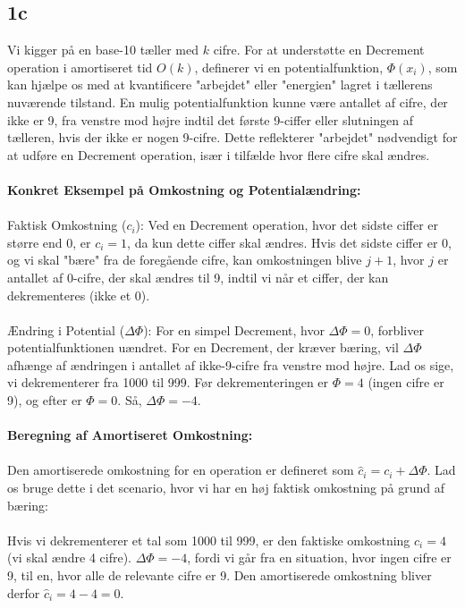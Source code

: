 \documentclass{article}
\begin{document}
\subsection{1c}
Vi kigger på en base-10 tæller med $k$ cifre. For at understøtte en Decrement operation i amortiseret tid $O(k)$, definerer vi en potentialfunktion, $\Phi(x_i)$, som kan hjælpe os med at kvantificere "arbejdet" eller "energien" lagret i tællerens nuværende tilstand. En mulig potentialfunktion kunne være antallet af cifre, der ikke er 9, fra venstre mod højre indtil det første 9-ciffer eller slutningen af tælleren, hvis der ikke er nogen 9-cifre. Dette reflekterer "arbejdet" nødvendigt for at udføre en Decrement operation, især i tilfælde hvor flere cifre skal ændres.
\\
\\
\textbf{Konkret Eksempel på Omkostning og Potentialændring:}
\\
\\
Faktisk Omkostning ($c_i$): Ved en Decrement operation, hvor det sidste ciffer er større end 0, er $c_i = 1$, da kun dette ciffer skal ændres. Hvis det sidste ciffer er 0, og vi skal "bære" fra de foregående cifre, kan omkostningen blive $j+1$, hvor $j$ er antallet af 0-cifre, der skal ændres til 9, indtil vi når et ciffer, der kan dekrementeres (ikke et 0).
\\
\\
Ændring i Potential ($\Delta\Phi$): For en simpel Decrement, hvor $\Delta\Phi = 0$, forbliver potentialfunktionen uændret. For en Decrement, der kræver bæring, vil $\Delta\Phi$ afhænge af ændringen i antallet af ikke-9-cifre fra venstre mod højre. Lad os sige, vi dekrementerer fra 1000 til 999. Før dekrementeringen er $\Phi = 4$ (ingen cifre er 9), og efter er $\Phi = 0$. Så, $\Delta\Phi = -4$.
\\
\\
\textbf{Beregning af Amortiseret Omkostning:}
\\
\\
Den amortiserede omkostning for en operation er defineret som $\hat{c}_i = c_i + \Delta\Phi$. Lad os bruge dette i det scenario, hvor vi har en høj faktisk omkostning på grund af bæring:
\\
\\
Hvis vi dekrementerer et tal som 1000 til 999, er den faktiske omkostning $c_i = 4$ (vi skal ændre 4 cifre). $\Delta\Phi = -4$, fordi vi går fra en situation, hvor ingen cifre er 9, til en, hvor alle de relevante cifre er 9.
Den amortiserede omkostning bliver derfor $\hat{c}_i = 4 - 4 = 0$.
\end{document}
